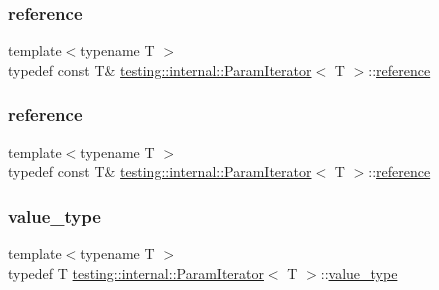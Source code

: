 \subsubsection{\texorpdfstring{reference}{reference}\hspace{0.1cm}{\footnotesize\ttfamily [2/3]}}
{\footnotesize\ttfamily template$<$typename T $>$ \\
typedef const T\& \mbox{\hyperlink{classtesting_1_1internal_1_1_param_iterator}{testing\+::internal\+::\+Param\+Iterator}}$<$ T $>$\+::\mbox{\hyperlink{classtesting_1_1internal_1_1_param_iterator_ac96f133ffa06fc0f9faff5a1c7954382}{reference}}}

\mbox{\label{classtesting_1_1internal_1_1_param_iterator_ac96f133ffa06fc0f9faff5a1c7954382}} 
\subsubsection{\texorpdfstring{reference}{reference}\hspace{0.1cm}{\footnotesize\ttfamily [3/3]}}
{\footnotesize\ttfamily template$<$typename T $>$ \\
typedef const T\& \mbox{\hyperlink{classtesting_1_1internal_1_1_param_iterator}{testing\+::internal\+::\+Param\+Iterator}}$<$ T $>$\+::\mbox{\hyperlink{classtesting_1_1internal_1_1_param_iterator_ac96f133ffa06fc0f9faff5a1c7954382}{reference}}}

\mbox{\label{classtesting_1_1internal_1_1_param_iterator_a4afe3a68db0d0744753c8afe262e35df}} 
\subsubsection{\texorpdfstring{value\_type}{value\_type}\hspace{0.1cm}{\footnotesize\ttfamily [1/3]}}
{\footnotesize\ttfamily template$<$typename T $>$ \\
typedef T \mbox{\hyperlink{classtesting_1_1internal_1_1_param_iterator}{testing\+::internal\+::\+Param\+Iterator}}$<$ T $>$\+::\mbox{\hyperlink{classtesting_1_1internal_1_1_param_iterator_a4afe3a68db0d0744753c8afe262e35df}{value\+\_\+type}}}

